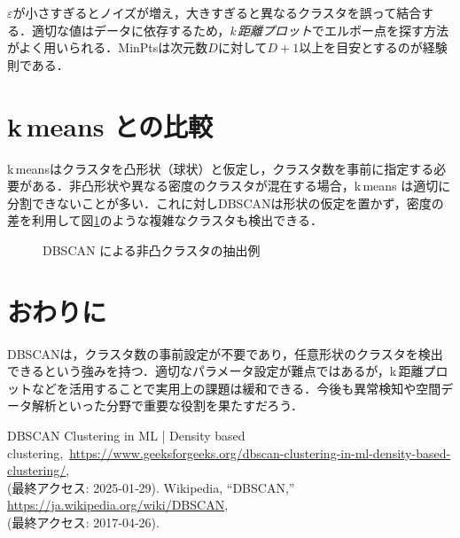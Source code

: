 \documentclass[a4j]{jsarticle}
\begin{document}
$\varepsilon$が小さすぎるとノイズが増え，大きすぎると異なるクラスタを誤って結合する．適切な値はデータに依存するため，\emph{k\,\-距離プロット}でエルボー点を探す方法がよく用いられる．MinPtsは次元数$D$に対して$D+1$以上を目安とするのが経験則である．

\section{k\,\-means との比較}

k\,\-meansはクラスタを凸形状（球状）と仮定し，クラスタ数を事前に指定する必要がある．非凸形状や異なる密度のクラスタが混在する場合，k\,\-means は適切に分割できないことが多い．これに対しDBSCANは形状の仮定を置かず，密度の差を利用して図\ref{fig:dbscan}のような複雑なクラスタも検出できる．

\begin{figure}[htbp]
  \centering
  \caption{DBSCAN による非凸クラスタの抽出例}
  \label{fig:dbscan}
\end{figure}

\section{おわりに}

DBSCANは，クラスタ数の事前設定が不要であり，任意形状のクラスタを検出できるという強みを持つ．適切なパラメータ設定が難点ではあるが，k\,\-距離プロットなどを活用することで実用上の課題は緩和できる．今後も異常検知や空間データ解析といった分野で重要な役割を果たすだろう．

\begin{thebibliography}{99}
   DBSCAN Clustering in ML | Density based clustering,\
        \url{https://www.geeksforgeeks.org/dbscan-clustering-in-ml-density-based-clustering/},\\
        (最終アクセス: 2025‑01‑29).
   Wikipedia, ``DBSCAN,''\\
        \url{https://ja.wikipedia.org/wiki/DBSCAN},\\
        (最終アクセス: 2017‑04‑26).
\end{thebibliography}
\end{document}
